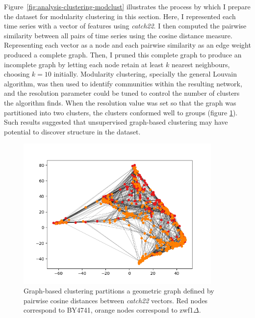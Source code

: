 Figure~\ref{fig:analysis-clustering-modclust} illustrates the process by which I prepare the dataset for modularity clustering in this section.
Here, I represented each time series with a vector of features using \textit{catch22}.
I then computed the pairwise similarity between all pairs of time series using the cosine distance measure.
Representing each vector as a node and each pairwise similarity as an edge weight produced a complete graph.
Then, I pruned this complete graph to produce an incomplete graph by letting each node retain at least $k$ nearest neighbours, choosing $k = 10$ initially.
Modularity clustering, specially the general Louvain algorithm, was then used to identify communities within the resulting network, and the resolution parameter could be tuned to control the number of clusters the algorithm finds.
When the resolution value was set so that the graph was partitioned into two clusters, the clusters conformed well to groups (figure \ref{fig:graphclustering}). %
Such results suggested that unsupervised graph-based clustering may have potential to discover structure in the dataset.


\begin{figure}[htbp]
  \centering
  \includegraphics[width=0.9\textwidth]{graphclustering}
  \caption{
    Graph-based clustering partitions a geometric graph defined by pairwise cosine distances between \textit{catch22} vectors.
    Red nodes correspond to BY4741, orange nodes correspond to zwf1$\Delta$.
  }
  \label{fig:graphclustering}
\end{figure}

